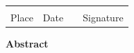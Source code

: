 \documentclass[
	pdftex,
	oneside,
	12pt,
	parskip=half,
]{scrreprt}
\begin{document}
    \begin{tabular}{ p{3cm}p{3cm}p{1cm}p{5cm} }
        \hrulefill & \hrulefill & & \hrulefill\\
        Place & Date & & Signature\\
    \end{tabular}

	\newpage
	\pagestyle{plain}

    \vspace*{5cm} 
    \begin{center}
        \textbf{Abstract}
    \end{center}

    

    \newpage

    \tableofcontents

    \newpage

    

    \newpage

    
    

	\clearpage
	
\end{document}
